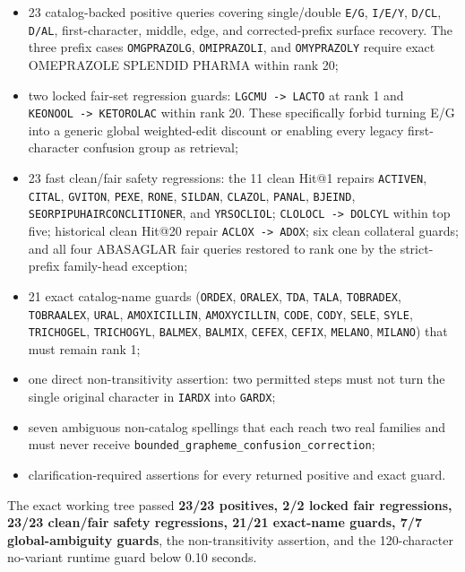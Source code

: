 \begin{itemize}
\tightlist
\item
  23 catalog-backed positive queries covering single/double \texttt{E/G}, \texttt{I/E/Y}, \texttt{D/CL}, \texttt{D/AL}, first-character, middle, edge, and corrected-prefix surface recovery. The three prefix cases \texttt{OMGPRAZOLG}, \texttt{OMIPRAZOLI}, and \texttt{OMYPRAZOLY} require exact OMEPRAZOLE SPLENDID PHARMA within rank 20;
\item
  two locked fair-set regression guards: \texttt{LGCMU\ -\textgreater{}\ LACTO} at rank 1 and \texttt{KEONOOL\ -\textgreater{}\ KETOROLAC} within rank 20. These specifically forbid turning E/G into a generic global weighted-edit discount or enabling every legacy first-character confusion group as retrieval;
\item
  23 fast clean/fair safety regressions: the 11 clean Hit@1 repairs \texttt{ACTIVEN}, \texttt{CITAL}, \texttt{GVITON}, \texttt{PEXE}, \texttt{RONE}, \texttt{SILDAN}, \texttt{CLAZOL}, \texttt{PANAL}, \texttt{BJEIND}, \texttt{SEORPIPUHAIRCONCLITIONER}, and \texttt{YRSOCLIOL}; \texttt{CLOLOCL\ -\textgreater{}\ DOLCYL} within top five; historical clean Hit@20 repair \texttt{ACLOX\ -\textgreater{}\ ADOX}; six clean collateral guards; and all four ABASAGLAR fair queries restored to rank one by the strict-prefix family-head exception;
\item
  21 exact catalog-name guards (\texttt{ORDEX}, \texttt{ORALEX}, \texttt{TDA}, \texttt{TALA}, \texttt{TOBRADEX}, \texttt{TOBRAALEX}, \texttt{URAL}, \texttt{AMOXICILLIN}, \texttt{AMOXYCILLIN}, \texttt{CODE}, \texttt{CODY}, \texttt{SELE}, \texttt{SYLE}, \texttt{TRICHOGEL}, \texttt{TRICHOGYL}, \texttt{BALMEX}, \texttt{BALMIX}, \texttt{CEFEX}, \texttt{CEFIX}, \texttt{MELANO}, \texttt{MILANO}) that must remain rank 1;
\item
  one direct non-transitivity assertion: two permitted steps must not turn the single original character in \texttt{IARDX} into \texttt{GARDX};
\item
  seven ambiguous non-catalog spellings that each reach two real families and must never receive \texttt{bounded\_\allowbreak{}grapheme\_\allowbreak{}confusion\_\allowbreak{}correction};
\item
  clarification-required assertions for every returned positive and exact guard.
\end{itemize}

The exact working tree passed \textbf{23/23 positives, 2/2 locked fair regressions, 23/23 clean/fair safety regressions, 21/21 exact-name guards, 7/7 global-ambiguity guards}, the non-transitivity assertion, and the 120-character no-variant runtime guard below 0.10 seconds.

